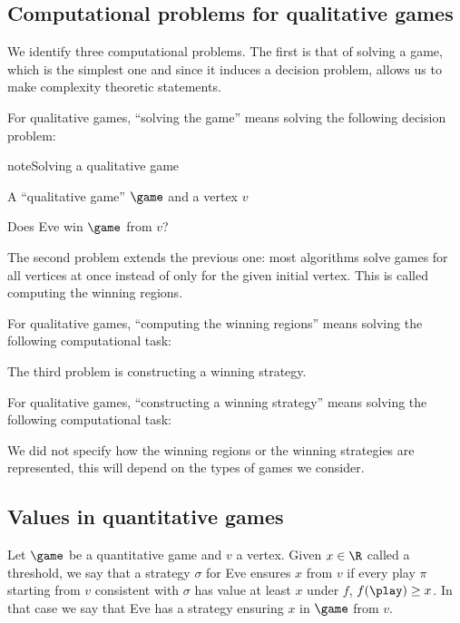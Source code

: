\documentclass[letterpaper,10pt,english]{sphinxmanual}
\begin{document}
\subsection{Computational problems for qualitative games}
\label{\detokenize{1_Introduction/simple:computational-problems-for-qualitative-games}}\label{\detokenize{1_Introduction/simple:subsec-computational-problems-for-qualitative-games}}
We identify three computational problems. The first is that of
solving a game, which is the simplest one and since it induces a
decision problem, allows us to make complexity theoretic statements.

For qualitative games, “solving the game” means solving the following
decision problem:

\begin{sphinxadmonition}{note}{Solving a qualitative game}

A “qualitative game” \(\game\) and a vertex \(v\)

Does Eve win \(\game\) from \(v\)?
\end{sphinxadmonition}

The second problem extends the previous one: most algorithms solve games
for all vertices at once instead of only for the given initial vertex.
This is called computing the winning regions.

For qualitative games, “computing the winning regions” means solving the
following computational task:

The third problem is constructing a winning strategy.

For qualitative games, “constructing a winning strategy” means solving
the following computational task:

We did not specify how the winning regions or the winning strategies are
represented, this will depend on the types of games we consider.


\subsection{Values in quantitative games}
\label{\detokenize{1_Introduction/simple:values-in-quantitative-games}}\label{\detokenize{1_Introduction/simple:subsec-values-in-quantitative-games}}
Let \(\game\) be a quantitative game and \(v\) a vertex. Given \(x \in \R\)
called a threshold, we say that a strategy \(\sigma\) for Eve
ensures \(x\) from \(v\) if every play \(\pi\) starting from \(v\)
consistent with \(\sigma\) has value at least \(x\) under \(f\), 
\(f(\play) \ge x\). In that case we say that Eve has a strategy ensuring
\(x\) in \(\game\) from \(v\).
\end{document}
